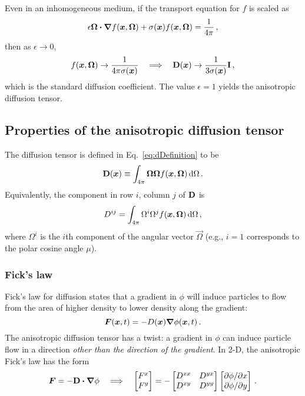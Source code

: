 Even in an inhomogeneous medium, if the transport equation for $f$ is
scaled as
\begin{equation*}
  \epsilon \bm{\Omega}\bm{\cdot}\bm{\nabla} f(\bm{x},\bm{\Omega})
  + \sigma(\bm{x})  f(\bm{x},\bm{\Omega}) = \frac{1}{4\pi}\,,
\end{equation*}
then as $\epsilon\to 0$,
\begin{equation*}
  f(\bm{x}, \bm{\Omega}) \to \frac{1}{4\pi \sigma(\bm{x})} \quad \Longrightarrow \quad
  \mathbf{D}(\bm{x}) \to \frac{1}{3 \sigma(\bm{x})} \mathbf{I}\,,
\end{equation*}
which is the standard diffusion coefficient. The value $\epsilon=1$ yields the
anisotropic diffusion tensor.

\subsection{Properties of the anisotropic diffusion tensor}
The diffusion tensor is defined in Eq.~\eqref{eq:dDefinition} to be
\begin{equation*}
  \mathbf{D}(\bm{x}) \equiv \int_{4\pi} \bm{\Omega} \bm{\Omega}
  f(\bm{x}, \bm{\Omega}) \mathop{}\!\mathrm{d}\Omega \,.
\end{equation*}
Equivalently, the component in row $i$, column $j$ of $\mathbf{D}$ is
\begin{equation}\label{eq:dij}
  D^{ij} = \int_{4\pi} \Omega^i \Omega^j
  f(\bm{x}, \bm{\Omega}) \mathop{}\!\mathrm{d}\Omega \,,
\end{equation}
where $\Omega^i$ is the $i$th component of the angular vector $\vec{\Omega}$
(e.g., $i=1$ corresponds to the polar cosine angle $\mu$).

\subsubsection{Fick's law}
Fick's law for diffusion states that a gradient in $\phi$ will induce particles
to flow from the area of higher density to lower density along the gradient:
\begin{equation*}
  \bm{F}(\bm{x},t) = - D(\bm{x}) \bm{\nabla} \phi(\bm{x},t)\,.
\end{equation*}
The anisotropic diffusion tensor has a twist: a gradient in $\phi$ can induce
particle flow in a direction \emph{other than the direction of the gradient}. In
2-D, the anisotropic Fick's law has the form
\begin{equation*}
  \bm{F} = - \mathbf{D} \bm{\cdot} \bm{\nabla} \phi
  \quad \Longrightarrow \quad
  \begin{bmatrix}
    F^x \\
    F^y
  \end{bmatrix}
  =
  -
  \begin{bmatrix}
    D^{xx} & D^{yx} \\
    D^{xy} & D^{yy}
  \end{bmatrix}
  \begin{bmatrix}
    {\partial \phi}/{\partial x} \\
    {\partial \phi}/{\partial y}
  \end{bmatrix} \,.
\end{equation*}

